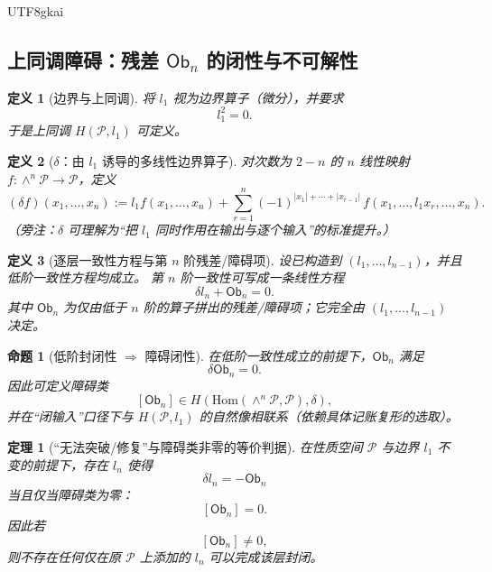 \documentclass[12pt]{article}
\newtheorem{definition}{定义}[section]
\newtheorem{theorem}{定理}[section]
\newtheorem{proposition}{命题}[section]
\newcommand{\Ob}{\ensuremath{\mathsf{Ob}}}
\begin{document}
\begin{CJK*}{UTF8}{gkai}
\subsection{上同调障碍：残差 $\Ob_n$ 的闭性与不可解性}
\label{subsec:tex18-obstruction}

\begin{definition}[边界与上同调]
将 $l_1$ 视为边界算子（微分），并要求
\begin{equation}
\tag{A1}
\label{eq:A1-diff}
  l_1^2=0.
\end{equation}
于是上同调 $H(\mathcal{P},l_1)$ 可定义。
\end{definition}

\begin{definition}[$\delta$：由 $l_1$ 诱导的多线性边界算子]
对次数为 $2-n$ 的 $n$ 线性映射 $f:\wedge^n\mathcal{P}\to\mathcal{P}$，定义
\begin{equation}
\tag{A2}
\label{eq:A2-delta}
  (\delta f)(x_1,\dots,x_n)
  :=
  l_1 f(x_1,\dots,x_n)
  +
  \sum_{r=1}^n (-1)^{|x_1|+\cdots+|x_{r-1}|}\,
  f(x_1,\dots,l_1x_r,\dots,x_n).
\end{equation}
（旁注：$\delta$ 可理解为“把 $l_1$ 同时作用在输出与逐个输入”的标准提升。）
\end{definition}

\begin{definition}[逐层一致性方程与第 $n$ 阶残差/障碍项]
设已构造到 $(l_1,\dots,l_{n-1})$，并且低阶一致性方程均成立。
第 $n$ 阶一致性可写成一条线性方程
\begin{equation}
\tag{A3}
\label{eq:A3-level-n}
  \delta l_n + \Ob_n = 0.
\end{equation}
其中 $\Ob_n$ 为仅由低于 $n$ 阶的算子拼出的残差/障碍项；它完全由 $(l_1,\dots,l_{n-1})$ 决定。
\end{definition}

\begin{proposition}[低阶封闭性 $\Rightarrow$ 障碍闭性]
在低阶一致性成立的前提下，$\Ob_n$ 满足
\begin{equation}
\tag{A3a}
\label{eq:A3a-ob-closed}
  \delta \Ob_n = 0.
\end{equation}
因此可定义障碍类
\[
  [\Ob_n]\in H\!\left(\mathrm{Hom}(\wedge^n\mathcal{P},\mathcal{P}),\delta\right),
\]
并在“闭输入”口径下与 $H(\mathcal{P},l_1)$ 的自然像相联系（依赖具体记账复形的选取）。
\end{proposition}

\begin{theorem}[“无法突破/修复”与障碍类非零的等价判据]
在性质空间 $\mathcal{P}$ 与边界 $l_1$ 不变的前提下，存在 $l_n$ 使得
\begin{equation}
\tag{A4}
\label{eq:A4-delta-ln}
  \delta l_n = -\Ob_n
\end{equation}
当且仅当障碍类为零：
\begin{equation}
\tag{A6}
\label{eq:A6-ob-vanish}
  [\Ob_n]=0.
\end{equation}
因此若
\begin{equation}
\tag{A7}
\label{eq:A7-ob-nonzero}
  [\Ob_n]\neq 0,
\end{equation}
则不存在任何仅在原 $\mathcal{P}$ 上添加的 $l_n$ 可以完成该层封闭。
\end{theorem}


\end{CJK*}
\end{document}

